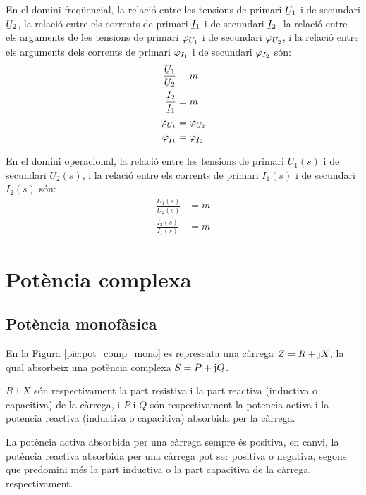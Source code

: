  En el domini
freq\"{u}encial, la relaci\'{o} entre les tensions de primari $\cmplx{U}_1$
i de secundari $\cmplx{U}_2$, la relaci\'{o} entre els corrents de
primari $\cmplx{I}_1$ i de secundari $\cmplx{I}_2$, la relaci\'{o} entre
els arguments de les tensions de primari $\varphi_{\cmplx{U}_1}$ i
de secundari $\varphi_{\cmplx{U}_2}$, i  la relaci\'{o} entre els
arguments dels corrents de primari $\varphi_{\cmplx{I}_1}$ i de
secundari $\varphi_{\cmplx{I}_2}$ s\'{o}n:
\begin{align}
   \frac{\cmplx{U}_1}{\cmplx{U}_2} &= m  \\
   \frac{\cmplx{I}_2}{\cmplx{I}_1} &= m \\
   \varphi_{\cmplx{U}_1} &= \varphi_{\cmplx{U}_2} \\
   \varphi_{\cmplx{I}_1} &= \varphi_{\cmplx{I}_2}
\end{align}

 En el domini operacional, la relaci\'{o} entre les tensions de primari $U_1(s)$ i de secundari $U_2(s)$,  i la relaci\'{o} entre els corrents de primari $I_1(s)$ i de secundari $I_2(s)$ s\'{o}n:
\begin{align}
   \frac{U_1(s)}{U_2(s)} &= m  \\
   \frac{I_2(s)}{I_1(s)} &= m
\end{align}


\section{Pot\`{e}ncia complexa}\label{sec:pot_complex} 

\subsection{Pot\`{e}ncia monof\`{a}sica} 

En la Figura \vref{pic:pot_comp_mono} es representa una c\`{a}rrega $\cmplx{Z}=R+\ju X$, la
qual absorbeix una pot\`{e}ncia complexa $\cmplx{S} = P + \ju Q$.

$R$ i $X$ s\'{o}n respectivament la part resistiva i la part reactiva
(inductiva o capacitiva) de la c\`{a}rrega, i $P$ i $Q$ s\'{o}n
respectivament la potencia activa i la potencia reactiva (inductiva
o capacitiva) absorbida per la c\`{a}rrega.

La pot\`{e}ncia activa absorbida per una c\`{a}rrega sempre \'{e}s positiva, en
canvi, la pot\`{e}ncia reactiva absorbida per una c\`{a}rrega pot ser
positiva o negativa, segons que predomini m\'{e}s la part inductiva o la
part capacitiva de la c\`{a}rrega, respectivament.

